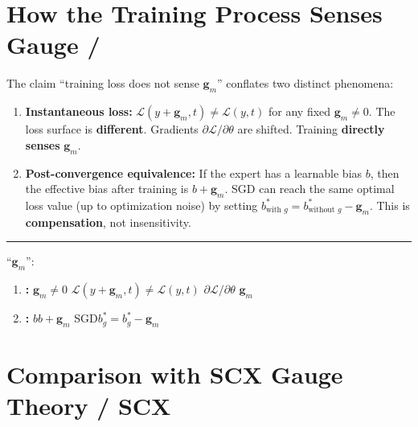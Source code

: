 \documentclass[11pt,a4paper]{article}
\newcommand{\gauge}{\mathbf{g}}
\begin{document}
\section{How the Training Process Senses Gauge / }

The claim ``training loss does not sense $\gauge_m$'' conflates two distinct
phenomena:

\begin{enumerate}
    \item \textbf{Instantaneous loss:} $\mathcal{L}(y + \gauge_m, t) \neq \mathcal{L}(y, t)$
    for any fixed $\gauge_m \neq 0$. The loss surface is \textbf{different}.
    Gradients $\partial\mathcal{L}/\partial\theta$ are shifted. Training
    \textbf{directly senses} $\gauge_m$.

    \item \textbf{Post-convergence equivalence:} If the expert has a learnable
    bias $b$, then the effective bias after training is $b + \gauge_m$.
    SGD can reach the same optimal loss value (up to optimization noise) by
    setting $b^*_{\text{with }g} = b^*_{\text{without }g} - \gauge_m$.
    This is \textbf{compensation}, not insensitivity.
\end{enumerate}

\noindent\rule{\textwidth}{0.5pt}

``$\gauge_m$'':

\begin{enumerate}
    \item \textbf{:} $\gauge_m \neq 0$
    $\mathcal{L}(y + \gauge_m, t) \neq \mathcal{L}(y, t)$
    \textbf{}$\partial\mathcal{L}/\partial\theta$
    \textbf{}$\gauge_m$

    \item \textbf{:} $b$$b + \gauge_m$
    SGD$b^*_{\text{}g} = b^*_{\text{}g} - \gauge_m$
    \textbf{}
\end{enumerate}

\section{Comparison with SCX Gauge Theory / SCX}
\end{document}
